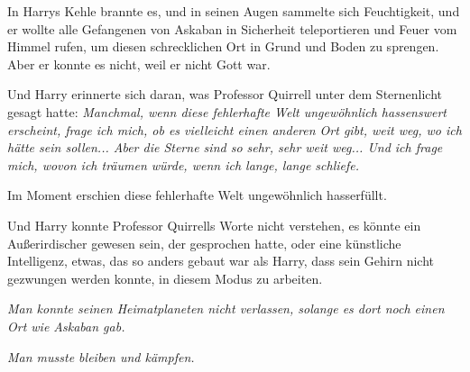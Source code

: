 In Harrys Kehle brannte es, und in seinen Augen sammelte sich Feuchtigkeit, und
er wollte alle Gefangenen von Askaban in Sicherheit teleportieren und Feuer vom
Himmel rufen, um diesen schrecklichen Ort in Grund und Boden zu sprengen. Aber
er konnte es nicht, weil er nicht Gott war.

Und Harry erinnerte sich daran, was Professor Quirrell unter dem Sternenlicht
gesagt hatte: \emph{Manchmal, wenn diese fehlerhafte Welt ungewöhnlich
hassenswert erscheint, frage ich mich, ob es vielleicht einen anderen Ort gibt,
weit weg, wo ich hätte sein sollen... Aber die Sterne sind so sehr, sehr weit
weg... Und ich frage mich, wovon ich träumen würde, wenn ich lange, lange
schliefe.}

Im Moment erschien diese fehlerhafte Welt ungewöhnlich hasserfüllt.

Und Harry
konnte Professor Quirrells Worte nicht verstehen, es könnte ein Außerirdischer
gewesen sein, der gesprochen hatte, oder eine künstliche Intelligenz, etwas, das
so anders gebaut war als Harry, dass sein Gehirn nicht gezwungen werden konnte,
in diesem Modus zu arbeiten.

\emph{Man konnte seinen Heimatplaneten nicht verlassen, solange es dort noch
einen Ort wie Askaban gab.}

\emph{Man musste bleiben und kämpfen.}
